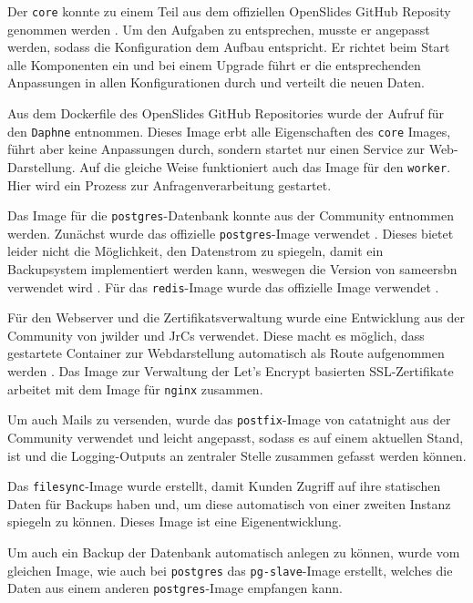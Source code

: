 \documentclass[11pt,a4paper]{article}
\begin{document}
Der \texttt{core} konnte zu einem Teil aus dem offiziellen OpenSlides GitHub 
Reposity genommen werden \cite{osgh}. Um den Aufgaben zu entsprechen, musste er 
angepasst werden, sodass die Konfiguration dem Aufbau entspricht. Er richtet 
beim Start alle Komponenten ein und bei einem Upgrade führt er die 
entsprechenden Anpassungen in allen Konfigurationen durch und verteilt die 
neuen Daten.

Aus dem Dockerfile des OpenSlides GitHub Repositories wurde der Aufruf für den 
\texttt{Daphne} \cite{osgh} entnommen. Dieses Image erbt alle Eigenschaften des 
\texttt{core} Images, führt aber keine Anpassungen durch, sondern startet nur 
einen Service zur Web-Darstellung. Auf die gleiche Weise funktioniert auch das 
Image für den \texttt{worker}. Hier wird ein Prozess zur 
Anfragenverarbeitung gestartet.

Das Image für die \texttt{postgres}-Datenbank konnte aus der Community 
entnommen werden. Zunächst wurde das offizielle \texttt{postgres}-Image 
verwendet \cite{pgoffdock}. Dieses bietet leider nicht die Möglichkeit, den 
Datenstrom zu spiegeln, damit ein Backupsystem implementiert werden kann, 
weswegen die Version von \glqq{}sameersbn\grqq{} verwendet wird \cite{pgdock}.
Für das \texttt{redis}-Image wurde das offizielle Image verwendet 
\cite{reddock}.

Für den Webserver und die Zertifikatsverwaltung wurde eine Entwicklung aus der 
Community von \glqq{}jwilder\grqq{} und \glqq{}JrCs\grqq{} verwendet. Diese 
macht es möglich, dass gestartete Container zur Webdarstellung automatisch als 
Route aufgenommen werden \cite{nginxjwilderdock}. Das Image zur Verwaltung der 
Let's Encrypt basierten SSL-Zertifikate\cite{letsencrypt} arbeitet mit dem 
Image für \texttt{nginx} zusammen\cite{lejrcsdock}.

Um auch Mails zu versenden, wurde das \texttt{postfix}-Image von 
\grqq{}catatnight\glqq{} aus der Community verwendet\cite{postfixdock} und 
leicht angepasst, sodass es auf einem aktuellen Stand, ist und die 
Logging-Outputs an zentraler Stelle zusammen gefasst werden können.

Das \texttt{filesync}-Image wurde erstellt, damit Kunden Zugriff auf ihre 
statischen Daten für Backups haben und, um diese automatisch von 
einer zweiten Instanz spiegeln zu können. Dieses Image ist eine 
Eigenentwicklung.

Um auch ein Backup der Datenbank automatisch anlegen zu können, wurde vom 
gleichen Image, wie auch bei \texttt{postgres} das \texttt{pg-slave}-Image 
erstellt, welches die Daten aus einem anderen \texttt{postgres}-Image empfangen 
kann.
\newpage
\end{document}
